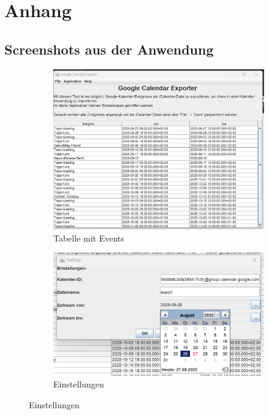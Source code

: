\documentclass[a4paper]{article}
\begin{document}
	\section{Anhang}
	\appendix
	
	\subsection*{Screenshots aus der Anwendung}
	\begin{figure}[H]
		\centering
		
		\begin{subfigure}[t]{0.45\textwidth}
			\centering
			\includegraphics[width=\textwidth]{img/example_table.png}
			\caption{Tabelle mit Events}
		\end{subfigure}
		
		\vspace{1em}
		
		
		\begin{subfigure}[t]{0.45\textwidth}
			\centering
			\includegraphics[width=\textwidth]{img/settings.png}
			\caption{Einstellungen}
		\end{subfigure}
		

\end{figure}
\end{document}
